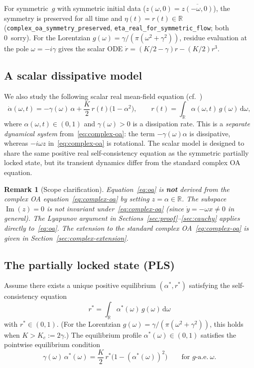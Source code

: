 \documentclass[11pt,a4paper]{article}
\newtheorem{remark}[theorem]{Remark}
\theoremstyle{definition}
\DeclareMathOperator{\im}{Im}
\newcommand{\R}{\mathbb{R}}
\begin{document}
For symmetric~$g$ with symmetric initial data ($z(\omega,0) = \overline{z(-\omega,0)}$), the symmetry is preserved for all time and $\eta(t) = r(t) \in \R$ (\texttt{complex\_oa\_symmetry\_preserved}, \texttt{eta\_real\_for\_symmetric\_flow}; both 0~sorry). For the Lorentzian $g(\omega) = \gamma/(\pi(\omega^2+\gamma^2))$, residue evaluation at the pole $\omega = -i\gamma$ gives the scalar ODE $\dot{r} = (K/2-\gamma)r - (K/2)r^3$.

\subsection{A scalar dissipative model}\label{sec:scalar-model}

We also study the following scalar real mean-field equation (cf.~\cite{strogatz2000,kuramoto1975})
\begin{equation}\label{eq:oa}
\dot{\alpha}(\omega,t) = -\gamma(\omega)\,\alpha + \frac{K}{2}\,r(t)\bigl(1 - \alpha^2\bigr), \qquad r(t) = \int_\R \alpha(\omega,t)\,g(\omega)\,\mathrm{d}\omega,
\end{equation}
where $\alpha(\omega,t) \in (0,1)$ and $\gamma(\omega) > 0$ is a dissipation rate. This is a \emph{separate dynamical system} from~\eqref{eq:complex-oa}: the term $-\gamma(\omega)\alpha$ is dissipative, whereas $-i\omega z$ in~\eqref{eq:complex-oa} is rotational. The scalar model is designed to share the same positive real self-consistency equation as the symmetric partially locked state, but its transient dynamics differ from the standard complex OA equation.

\begin{remark}[Scope clarification]\label{rem:scope}
Equation~\eqref{eq:oa} is \textbf{not} derived from the complex OA equation~\eqref{eq:complex-oa} by setting $z = \alpha \in \R$. The subspace $\im(z) = 0$ is not invariant under~\eqref{eq:complex-oa} (since $\dot{y} = -\omega x \neq 0$ in general). The Lyapunov argument in Sections~\ref{sec:proof}--\ref{sec:cauchy} applies directly to~\eqref{eq:oa}. The extension to the standard complex OA~\eqref{eq:complex-oa} is given in Section~\ref{sec:complex-extension}.
\end{remark}

\subsection{The partially locked state (PLS)}

Assume there exists a unique positive equilibrium $(\alpha^*, r^*)$ satisfying the self-consistency equation
\begin{equation}\label{eq:sc}
r^* = \int_\R \alpha^*(\omega)\,g(\omega)\,\mathrm{d}\omega
\end{equation}
with $r^* \in (0,1)$. (For the Lorentzian $g(\omega) = \gamma/(\pi(\omega^2+\gamma^2))$, this holds when $K > K_c := 2\gamma$.) The equilibrium profile $\alpha^*(\omega) \in (0,1)$ satisfies the pointwise equilibrium condition
\begin{equation}\label{eq:equil}
\gamma(\omega)\,\alpha^*(\omega) = \frac{K}{2}\,r^*\bigl(1 - (\alpha^*(\omega))^2\bigr) \qquad \text{for $g$-a.e.}\ \omega.
\end{equation}
\end{document}

